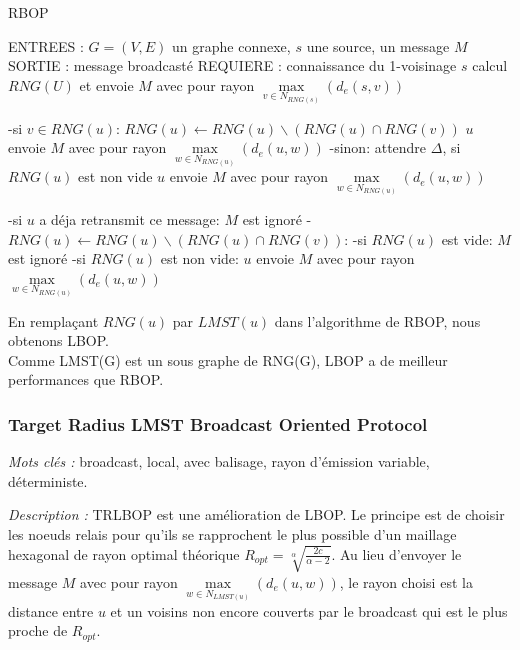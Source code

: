 \begin{algorithm}[H]
\caption{RBOP}
\label{algo_RBOP}
\begin{algorithmic}
\STATE ENTREES : $G=(V,E)$ un graphe connexe, $s$ une source, un message $M$
\STATE SORTIE : message broadcasté
\STATE REQUIERE : connaissance du 1-voisinage
\STATE $s$ calcul $RNG(U)$ et envoie $M$ avec pour rayon $\max\limits_{v\in N_{RNG(s)}}(d_e(s,v))$

		\STATE -si $v\in RNG(u)$: $RNG(u)\leftarrow RNG(u)\backslash(RNG(u)\cap RNG(v))$ $u$ envoie $M$ avec pour rayon $\max\limits_{w\in N_{RNG(u)}}(d_e(u,w))$
		\STATE -sinon: attendre $\Delta$, si $RNG(u)$ est non vide  $u$ envoie $M$ avec pour rayon $\max\limits_{w\in N_{RNG(u)}}(d_e(u,w))$
			 	
	\ENDIF
		\STATE -si $u$ a déja retransmit ce message: $M$ est ignoré
		\STATE -$RNG(u)\leftarrow RNG(u)\backslash(RNG(u)\cap RNG(v))$:
		\INDSTATE   -si $RNG(u)$ est vide: $M$ est ignoré
		\INDSTATE   -si $RNG(u)$ est non vide: $u$ envoie $M$ avec pour rayon $\max\limits_{w\in N_{RNG(u)}}(d_e(u,w))$
			 	
	\ENDIF

\ENDIF
\end{algorithmic}
\end{algorithm}

En remplaçant $RNG(u)$ par $LMST(u)$ dans l'algorithme de RBOP, nous obtenons LBOP.\\

Comme LMST(G) est un sous graphe de RNG(G), LBOP a de meilleur performances que RBOP.

\subsubsection{Target Radius LMST Broadcast Oriented Protocol \cite{Ingelrest2004}}
\emph{Mots clés :} broadcast, local, avec balisage, rayon d'émission variable, déterministe.

\emph{Description :} TRLBOP est une amélioration de LBOP. Le principe est de choisir les noeuds relais pour qu'ils se rapprochent le plus possible d'un maillage hexagonal de rayon optimal théorique $R_{opt}=\sqrt[\alpha]{\frac{2c}{\alpha-2}}$. Au lieu d'envoyer le message $M$ avec pour rayon $\max\limits_{w\in N_{LMST(u)}}(d_e(u,w))$, le rayon choisi est la distance entre $u$ et un voisins non encore couverts par le broadcast qui est le plus proche de $R_{opt}$.

